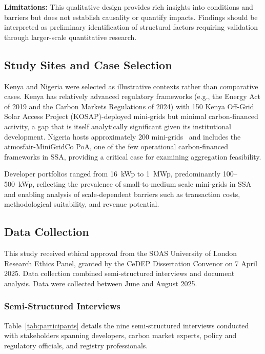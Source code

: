 \textbf{Limitations:} This qualitative design provides rich insights into conditions and barriers but does not establish causality or quantify impacts. Findings should be interpreted as preliminary identification of structural factors requiring validation through larger-scale quantitative research.

\subsection{Study Sites and Case Selection}
\label{subsec:site-selection}
Kenya and Nigeria were selected as illustrative contexts rather than comparative cases. Kenya has relatively advanced regulatory frameworks (e.g., the Energy Act of 2019 and the Carbon Markets Regulations of 2024) with 150 Kenya Off-Grid Solar Access Project (KOSAP)-deployed mini-grids but minimal carbon-financed activity, a gap that is itself analytically significant given its institutional development. Nigeria hosts approximately 200 mini-grids~\cite{rea2025} and includes the atmosfair-MiniGridCo PoA, one of the few operational carbon-financed frameworks in SSA, providing a critical case for examining aggregation feasibility.

Developer portfolios ranged from 16~kWp to 1~MWp, predominantly 100--500~kWp, reflecting the prevalence of small-to-medium scale mini-grids in SSA and enabling analysis of scale-dependent barriers such as transaction costs, methodological suitability, and revenue potential. 

\subsection{Data Collection}
This study received ethical approval from the SOAS University of London Research Ethics Panel, granted by the CeDEP Dissertation Convenor on 7 April 2025. Data collection combined semi-structured interviews and document analysis. Data were collected between June and August 2025.

\subsubsection{Semi-Structured Interviews}
\label{subsec:interviews}
Table~\ref{tab:participants} details the nine semi-structured interviews conducted with stakeholders spanning developers, carbon market experts, policy and regulatory officials, and registry professionals.

